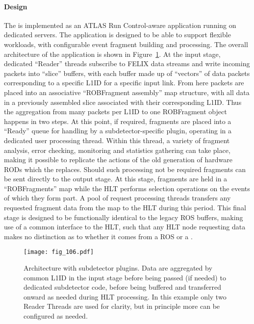 \documentclass[cernpreprint, atlasdraft=false, UKenglish,british,orcidlogo, texmf, orcidlogo]{atlasdoc}
\begin{document}
\paragraph{\swrod Design}
 
The \swrod is implemented as an ATLAS Run Control-aware application running on dedicated servers. The application is designed to be able to support flexible workloads, with configurable event fragment building and processing. The overall architecture of the \swrod application is shown in Figure~\ref{fig:TDAQ_DAQHLT_swrod}. At the input stage, dedicated ``Reader'' threads subscribe to \gls{FELIX} data streams and write incoming packets into ``slice'' buffers, with each buffer made up of ``vectors'' of data packets corresponding to a specific \gls{L1ID} for a specific input link. From here packets are placed into an associative ``\gls{ROB}Fragment assembly'' map structure, with all data in a previously assembled slice associated with their corresponding \gls{L1ID}. Thus the aggregation from many packets per \gls{L1ID} to one \gls{ROB}Fragment object happens in two steps. At this point, if required, fragments are placed into a ``Ready'' queue for handling by a subdetector-specific plugin, operating in a dedicated user processing thread. Within this thread, a variety of fragment analysis, error checking, monitoring and statistics gathering can take place, making it possible to replicate the actions of the old generation of hardware \glspl{ROD} which the \swrod replaces. Should such processing not be required fragments can be sent directly to the output stage. At this stage, fragments are held in a ``\gls{ROB}Fragments'' map while the \gls{HLT} performs selection operations on the events of which they form part. A pool of request processing threads transfers any requested fragment data from the map to the \gls{HLT} during this period. This final stage is designed to be functionally identical to the legacy \gls{ROS} buffers, making use of a common interface to the \gls{HLT}, such that any \gls{HLT} node requesting data makes no distinction as to whether it comes from a \gls{ROS} or a \swrod.
 
\begin{figure}[htbp!]
\centerline{\texttt{[image: fig\_106.pdf]}}
\caption{\swrod Architecture with subdetector plugins. Data are aggregated by common \gls{L1ID} in the input stage before being passed (if needed) to dedicated subdetector code, before being buffered and transferred onward as needed during \gls{HLT} processing. In this example only two Reader Threads are used for clarity, but in principle more can be configured as needed.}
\label{fig:TDAQ_DAQHLT_swrod}
\end{figure}
 
\end{document}
